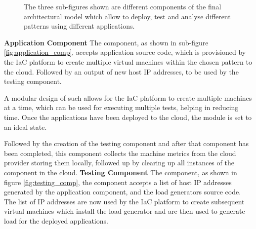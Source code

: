 \begin{figure}[H]
\caption{The three sub-figures shown are different components of the final architectural model which allow to deploy, test and analyse different patterns using different applications. }
\label{fig:main}
\end{figure}

\textbf{Application Component}
The component, as shown in sub-figure \ref{fig:application_comp}, accepts application source code, which is provisioned by the IaC platform to create multiple virtual machines within the chosen pattern to the cloud. Followed by an output of new host IP addresses, to be used by the testing component. 

A modular design of such allows for the IaC platform to create multiple machines at a time, which can be used for executing multiple tests, helping in reducing time. Once the applications have been deployed to the cloud, the module is set to an ideal state.

Followed by the creation of the testing component and after that component has been completed, this component collects the machine metrics from the cloud provider storing them locally, followed up by clearing up all instances of the component in the cloud. 
\textbf{Testing Component
}%
The component, as shown in figure \ref{fig:testing_comp}, the component accepts a list of host IP addresses generated by the application component, and the load generators source code. The list of IP addresses are now used by the IaC platform to create subsequent virtual machines which install the load generator and are then used to generate load for the deployed applications.

